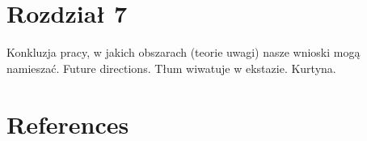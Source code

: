 \documentclass[
  man,draftall]{apa6}
\newlength{\cslhangindent}
\newlength{\cslentryspacingunit} %
\newenvironment{CSLReferences}[2] %
 {%
  \setlength{\parindent}{0pt}
  \ifodd #1
  \let\oldpar\par
  \def\par{\hangindent=\cslhangindent\oldpar}
  \fi
  \setlength{\parskip}{#2\cslentryspacingunit}
 }%
 {}
\begin{document}
\hypertarget{rozdziaux142-7}{%
\section{Rozdział 7}\label{rozdziaux142-7}}

Konkluzja pracy, w jakich obszarach (teorie uwagi) nasze wnioski mogą namieszać. Future directions. Tłum wiwatuje w ekstazie. Kurtyna.

\hypertarget{references}{%
\section{References}\label{references}}

\hypertarget{refs}{}
\begin{CSLReferences}{0}{0}
\end{CSLReferences}
\end{document}
